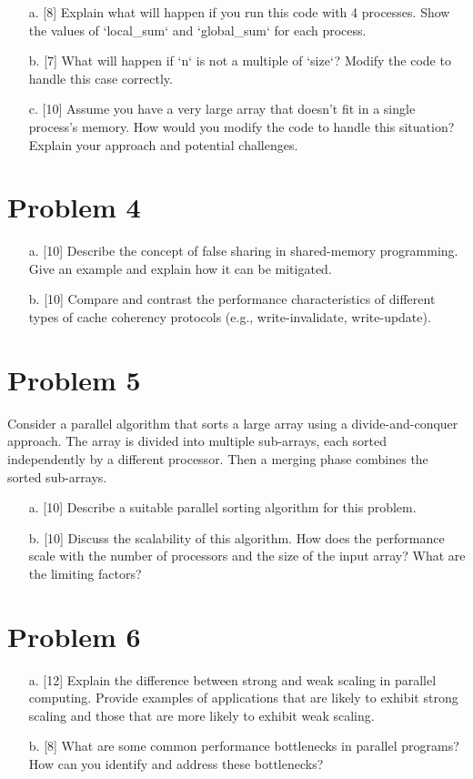 \documentclass{article}
\begin{document}
\begin{enumerate}
    \item[a.] [8]  Explain what will happen if you run this code with 4 processes. Show the values of `local_sum` and `global_sum` for each process.
    \item[b.] [7]  What will happen if `n` is not a multiple of `size`? Modify the code to handle this case correctly.
    \item[c.] [10]  Assume you have a very large array that doesn't fit in a single process's memory. How would you modify the code to handle this situation?  Explain your approach and potential challenges.

\end{enumerate}


\section*{Problem 4}
\begin{enumerate}
    \item[a.] [10] Describe the concept of false sharing in shared-memory programming.  Give an example and explain how it can be mitigated.
    \item[b.] [10]  Compare and contrast the performance characteristics of different types of cache coherency protocols (e.g., write-invalidate, write-update).
\end{enumerate}

\section*{Problem 5}
Consider a parallel algorithm that sorts a large array using a divide-and-conquer approach. The array is divided into multiple sub-arrays, each sorted independently by a different processor. Then a merging phase combines the sorted sub-arrays.

\begin{enumerate}
    \item[a.] [10] Describe a suitable parallel sorting algorithm for this problem.
    \item[b.] [10] Discuss the scalability of this algorithm.  How does the performance scale with the number of processors and the size of the input array?  What are the limiting factors?
\end{enumerate}

\section*{Problem 6}
\begin{enumerate}
    \item[a.] [12] Explain the difference between strong and weak scaling in parallel computing.  Provide examples of applications that are likely to exhibit strong scaling and those that are more likely to exhibit weak scaling.
    \item[b.] [8] What are some common performance bottlenecks in parallel programs? How can you identify and address these bottlenecks?
\end{enumerate}
\end{document}
